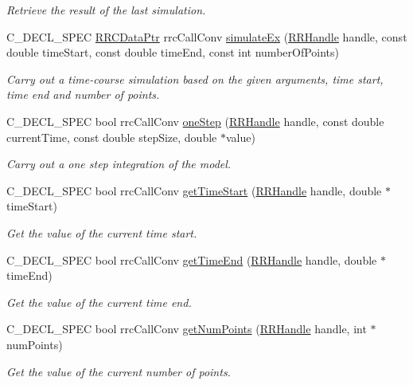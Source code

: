\begin{DoxyCompactItemize}
\begin{DoxyCompactList}\small\item\em Retrieve the result of the last simulation. \end{DoxyCompactList}\item 
C\+\_\+\+D\+E\+C\+L\+\_\+\+S\+P\+E\+C \hyperlink{rrc__types_8h_a9da8b124eb9c3c0045f8926c6a420b4a}{R\+R\+C\+Data\+Ptr} rrc\+Call\+Conv \hyperlink{group__simulation_ga12a2129f06507eafbace57a8612cc600}{simulate\+Ex} (\hyperlink{rrc__types_8h_a1d68f0592372208fa5a5f2799ea4b3ae}{R\+R\+Handle} handle, const double time\+Start, const double time\+End, const int number\+Of\+Points)
\begin{DoxyCompactList}\small\item\em Carry out a time-\/course simulation based on the given arguments, time start, time end and number of points. \end{DoxyCompactList}\item 
C\+\_\+\+D\+E\+C\+L\+\_\+\+S\+P\+E\+C bool rrc\+Call\+Conv \hyperlink{group__simulation_ga8f7109b90040ff57b8366c2f1867f066}{one\+Step} (\hyperlink{rrc__types_8h_a1d68f0592372208fa5a5f2799ea4b3ae}{R\+R\+Handle} handle, const double current\+Time, const double step\+Size, double $\ast$value)
\begin{DoxyCompactList}\small\item\em Carry out a one step integration of the model. \end{DoxyCompactList}\item 
C\+\_\+\+D\+E\+C\+L\+\_\+\+S\+P\+E\+C bool rrc\+Call\+Conv \hyperlink{group__simulation_ga0d05bdfec6dd9387c64dd196ec3d880d}{get\+Time\+Start} (\hyperlink{rrc__types_8h_a1d68f0592372208fa5a5f2799ea4b3ae}{R\+R\+Handle} handle, double $\ast$time\+Start)
\begin{DoxyCompactList}\small\item\em Get the value of the current time start. \end{DoxyCompactList}\item 
C\+\_\+\+D\+E\+C\+L\+\_\+\+S\+P\+E\+C bool rrc\+Call\+Conv \hyperlink{group__simulation_ga83a02783c6a1c48eb05eafce742972cd}{get\+Time\+End} (\hyperlink{rrc__types_8h_a1d68f0592372208fa5a5f2799ea4b3ae}{R\+R\+Handle} handle, double $\ast$time\+End)
\begin{DoxyCompactList}\small\item\em Get the value of the current time end. \end{DoxyCompactList}\item 
C\+\_\+\+D\+E\+C\+L\+\_\+\+S\+P\+E\+C bool rrc\+Call\+Conv \hyperlink{group__simulation_gaaa761b3be4a3348a60c7ae7083d57947}{get\+Num\+Points} (\hyperlink{rrc__types_8h_a1d68f0592372208fa5a5f2799ea4b3ae}{R\+R\+Handle} handle, int $\ast$num\+Points)
\begin{DoxyCompactList}\small\item\em Get the value of the current number of points. \end{DoxyCompactList}\end{DoxyCompactItemize}


